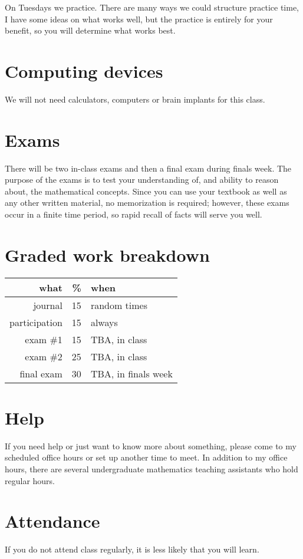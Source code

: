 \documentclass[12pt]{article}
\begin{document}
On Tuesdays we practice.  There are many ways we could structure practice time, I have some ideas on what works well, but the practice is
entirely for your benefit, so you will determine what works best.

\section*{Computing devices}
We will not need calculators, computers or brain implants for this class.  

\section*{Exams}
There will be two in-class exams and then a final exam during finals week. 
The purpose of the exams is to test your understanding of, and ability to reason about, the mathematical concepts. 
Since you can use your textbook as well as any other written material, no memorization is required; however, 
these exams occur in a finite time period, so rapid recall of facts will serve you well. 

\section*{Graded work breakdown}
\begin{tabular}{r | r | l}
what & \% & when \\
\hline
journal & 15 & random times \\
participation & 15 & always\\
exam \#1 & 15 & TBA, in class \\
exam \#2 & 25 & TBA, in class \\
final exam & 30 & TBA, in finals week \\
\end{tabular}

\section*{Help}
If you need help or just want to know more about something, please come to my scheduled office hours or set up another time to meet. 
In addition to my office hours, there are several undergraduate mathematics teaching assistants who hold regular hours.

\section*{Attendance}
If you do not attend class regularly, it is less likely that you will learn.
\end{document}
